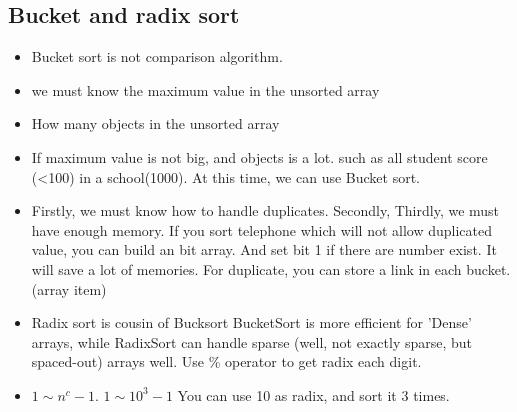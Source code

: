 \documentclass[a4paper,12pt,twoside]{book}
\begin{document}
\subsection{Bucket and radix sort}
\begin{itemize}


\item Bucket sort is not comparison algorithm.  
\item we must know the maximum value in the unsorted array
\item How many objects in the unsorted array
\item If maximum value is not big, and objects is a lot. such as all student score (<100) in a school(1000). At this time, we can use Bucket sort. 
	
\item Firstly, we must know how to handle duplicates. Secondly,  Thirdly, we must have enough memory. If you sort telephone which will not allow duplicated value, you can build an bit array. And set bit 1 if there are number exist. It will save a lot of memories.   For duplicate, you can store a link in each bucket. (array item)

\item Radix sort is cousin of Bucksort BucketSort is more efficient for 'Dense' arrays, while RadixSort can handle sparse (well, not exactly sparse, but spaced-out) arrays well. Use \% operator to get radix each digit. 

\item $ 1\sim n^c-1$. $ 1\sim10^3-1 $  You can use 10 as radix, and sort it 3 times. 

\end{itemize}
\end{document}

